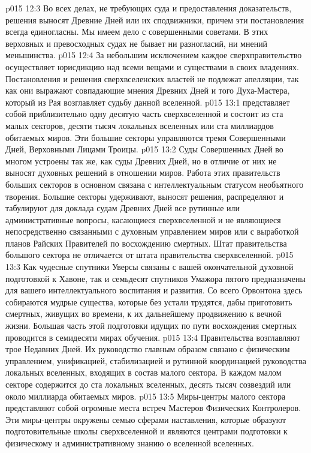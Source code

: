 \vs p015 12:3 Во всех делах, не требующих суда и предоставления доказательств, решения выносят Древние Дней или их сподвижники, причем эти постановления всегда единогласны. Мы имеем дело с совершенными советами. В этих верховных и превосходных судах не бывает ни разногласий, ни мнений меньшинства.
\vs p015 12:4 За небольшим исключением каждое сверхправительство осуществляет юрисдикцию над всеми вещами и существами в своих владениях. Постановления и решения сверхвселенских властей не подлежат апелляции, так как они выражают совпадающие мнения Древних Дней и того Духа\hyp{}Мастера, который из Рая возглавляет судьбу данной вселенной.
\vs p015 13:1  представляет собой приблизительно одну десятую часть сверхвселенной и состоит из ста малых секторов, десяти тысяч локальных вселенных или ста миллиардов обитаемых миров. Эти большие секторы управляются тремя Совершенными Дней, Верховными Лицами Троицы.
\vs p015 13:2 Суды Совершенных Дней во многом устроены так же, как суды Древних Дней, но в отличие от них не выносят духовных решений в отношении миров. Работа этих правительств больших секторов в основном связана с интеллектуальным статусом необъятного творения. Большие секторы удерживают, выносят решения, распределяют и табулируют для доклада судам Древних Дней все рутинные или административные вопросы, касающиеся сверхвселенной и не являющиеся непосредственно связанными с духовным управлением миров или с выработкой планов Райских Правителей по восхождению смертных. Штат правительства большого сектора не отличается от штата правительства сверхвселенной.
\vs p015 13:3 Как чудесные спутники Уверсы связаны с вашей окончательной духовной подготовкой к Хавоне, так и семьдесят спутников Умажора пятого предназначены для вашего интеллектуального воспитания и развития. Со всего Орвонтона здесь собираются мудрые существа, которые без устали трудятся, дабы приготовить смертных, живущих во времени, к их дальнейшему продвижению к вечной жизни. Большая часть этой подготовки идущих по пути восхождения смертных проводится в семидесяти мирах обучения.
\vs p015 13:4 \pc Правительства  возглавляют трое Недавних Дней. Их руководство главным образом связано с физическим управлением, унификацией, стабилизацией и рутинной координацией руководства локальных вселенных, входящих в состав малого сектора. В каждом малом секторе содержится до ста локальных вселенных, десять тысяч созвездий или около миллиарда обитаемых миров.
\vs p015 13:5 Миры\hyp{}центры малого сектора представляют собой огромные места встреч Мастеров Физических Контролеров. Эти миры\hyp{}центры окружены семью сферами наставления, которые образуют подготовительные школы сверхвселенной и являются центрами подготовки к физическому и административному знанию о вселенной вселенных.
